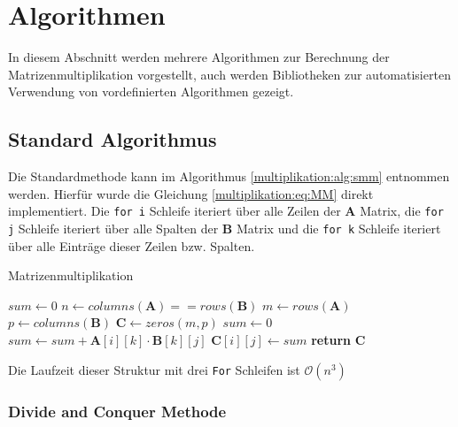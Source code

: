 %
%
%

\section{Algorithmen}

In diesem Abschnitt werden mehrere Algorithmen zur Berechnung der Matrizenmultiplikation vorgestellt, auch werden Bibliotheken zur automatisierten Verwendung von vordefinierten Algorithmen gezeigt.

\subsection{Standard Algorithmus}

Die Standardmethode kann im Algorithmus \ref{multiplikation:alg:smm} entnommen werden.
Hierf\"ur wurde die Gleichung \eqref{multiplikation:eq:MM} direkt implementiert.
Die \texttt{for i} Schleife iteriert \"uber alle Zeilen der $\mathbf{A}$ Matrix, die \texttt{for j} Schleife iteriert \"uber alle Spalten der $\mathbf{B}$ Matrix und die \texttt{for k} Schleife iteriert \"uber alle Eintr\"age dieser Zeilen bzw. Spalten.

\begin{algorithm}\footnotesize\caption{Matrizenmultiplikation}
	\label{multiplikation:alg:smm}
	\setlength{\lineskip}{7pt}
	\begin{algorithmic}[1]
		\State $sum \gets 0$
		\State $n \gets columns(\textbf{A}) == rows(\textbf{B})$
		\State $m \gets rows(\textbf{A})$
		\State $p \gets columns(\textbf{B})$
		\State $\textbf{C} \gets zeros(m,p)$
		\State $sum \gets 0$
		\State $sum \gets  sum + \textbf{A}[i][k] \cdot \textbf{B}[k][j]$
		\EndFor
		\State $\textbf{C}[i][j] \gets  sum $
		\EndFor
		\EndFor
		\State \textbf{return} $\textbf{C}$
		\EndFunction
	\end{algorithmic}
\end{algorithm}

Die Laufzeit dieser Struktur mit drei \texttt{For} Schleifen ist $\mathcal{O} (n^3)$

\subsubsection{Divide and Conquer Methode}

